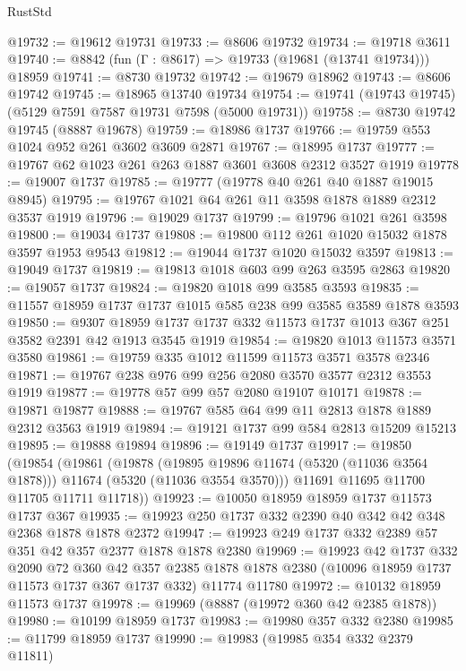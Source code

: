 \begin{lexlean}{RustStd}
\begin{coremodule}
@19732 := @19612 @19731
@19733 := @8606 @19732
@19734 := @19718 @3611
@19740 := @8842 (fun (Γ : @8617) => @19733 (@19681 (@13741 @19734))) @18959
@19741 := @8730 @19732
@19742 := @19679 @18962
@19743 := @8606 @19742
@19745 := @18965 @13740 @19734
@19754 := @19741 (@19743 @19745) (@5129 @7591 @7587 @19731 @7598 (@5000 @19731))
@19758 := @8730 @19742 @19745 (@8887 @19678)
@19759 := @18986 @1737
@19766 := @19759 @553 @1024 @952 @261 @3602 @3609 @2871
@19767 := @18995 @1737
@19777 := @19767 @62 @1023 @261 @263 @1887 @3601 @3608 @2312 @3527 @1919
@19778 := @19007 @1737
@19785 := @19777 (@19778 @40 @261 @40 @1887 @19015 @8945)
@19795 := @19767 @1021 @64 @261 @11 @3598 @1878 @1889 @2312 @3537 @1919
@19796 := @19029 @1737
@19799 := @19796 @1021 @261 @3598
@19800 := @19034 @1737
@19808 := @19800 @112 @261 @1020 @15032 @1878 @3597 @1953 @9543
@19812 := @19044 @1737 @1020 @15032 @3597
@19813 := @19049 @1737
@19819 := @19813 @1018 @603 @99 @263 @3595 @2863
@19820 := @19057 @1737
@19824 := @19820 @1018 @99 @3585 @3593
@19835 := @11557 @18959 @1737 @1737 @1015 @585 @238 @99 @3585 @3589 @1878 @3593
@19850 := @9307
    @18959
    @1737
    @1737
    @332
    @11573
    @1737
    @1013
    @367
    @251
    @3582
    @2391
    @42
    @1913
    @3545
    @1919
@19854 := @19820 @1013 @11573 @3571 @3580
@19861 := @19759 @335 @1012 @11599 @11573 @3571 @3578 @2346
@19871 := @19767 @238 @976 @99 @256 @2080 @3570 @3577 @2312 @3553 @1919
@19877 := @19778 @57 @99 @57 @2080 @19107 @10171
@19878 := @19871 @19877
@19888 := @19767 @585 @64 @99 @11 @2813 @1878 @1889 @2312 @3563 @1919
@19894 := @19121 @1737 @99 @584 @2813 @15209 @15213
@19895 := @19888 @19894
@19896 := @19149 @1737
@19917 := @19850
    (@19854
      (@19861
        (@19878
          (@19895 @19896 @11674 (@5320 (@11036 @3564 @1878)))
          @11674
          (@5320 (@11036 @3554 @3570)))
        @11691
        @11695
        @11700
        @11705
        @11711
        @11718))
@19923 := @10050 @18959 @18959 @1737 @11573 @1737 @367
@19935 := @19923 @250 @1737 @332 @2390 @40 @342 @42 @348 @2368 @1878 @1878 @2372
@19947 := @19923 @249 @1737 @332 @2389 @57 @351 @42 @357 @2377 @1878 @1878 @2380
@19969 := @19923
    @42
    @1737
    @332
    @2090
    @72
    @360
    @42
    @357
    @2385
    @1878
    @1878
    @2380
    (@10096 @18959 @1737 @11573 @1737 @367 @1737 @332)
    @11774
    @11780
@19972 := @10132 @18959 @11573 @1737
@19978 := @19969 (@8887 (@19972 @360 @42 @2385 @1878))
@19980 := @10199 @18959 @1737
@19983 := @19980 @357 @332 @2380
@19985 := @11799 @18959 @1737
@19990 := @19983 (@19985 @354 @332 @2379 @11811)

\end{coremodule}
\end{lexlean}
